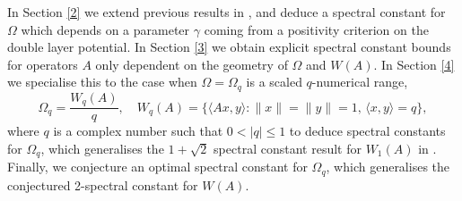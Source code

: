 \documentclass{article}
\begin{document}
In Section \ref{2} we extend previous results in \cite{CCpalenciaextension,crouzeix2019spectral}, and deduce a spectral constant for $\Omega$ which depends on a parameter $\gamma$ coming from a positivity criterion on the double layer potential. In Section \ref{3} we obtain explicit spectral constant bounds for operators $A$ only dependent on the geometry of $\Omega$ and $W(A)$. In Section \ref{4} we specialise this to the case when $\Omega = \Omega_q$ is a scaled $q$-numerical range,
$$
\Omega_q = \frac{W_q(A)}{q}, \quad W_q(A) = \{ \langle Ax,y \rangle : \|x\| = \|y\| = 1, \, \langle x,y \rangle = q \}, 
$$
where $q$ is a complex number such that $ 0< |q| \leq 1$ to deduce spectral constants for $\Omega_q$, which generalises the $1 + \sqrt{2}$ spectral constant result for $ W_1(A)$ in \cite{1root2}. Finally, we conjecture an optimal spectral constant for $\Omega_q$, which generalises the conjectured 2-spectral constant for $W(A)$.
















\end{document}

